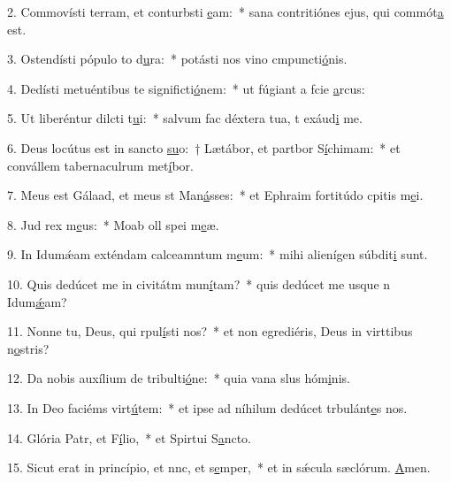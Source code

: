 2. Commovísti terram, et conturbsti \uline{e}am:~* sana contritiónes ejus, qui commót\uline{a} est.\par 
3. Ostendísti pópulo to d\uline{u}ra:~* potásti nos vino cmpuncti\uline{ó}nis.\par 
4. Dedísti metuéntibus te significti\uline{ó}nem:~* ut fúgiant a fcie \uline{a}rcus:\par 
5. Ut liberéntur dilcti t\uline{u}i:~* salvum fac déxtera tua, t exáud\uline{i} me.\par 
6. Deus locútus est in sancto \uline{su}o:~† Lætábor, et partbor S\uline{í}chimam:~* et convállem tabernaculrum met\uline{í}bor.\par 
7. Meus est Gálaad, et meus st Man\uline{á}sses:~* et Ephraim fortitúdo cpitis m\uline{e}i.\par 
8. Jud rex m\uline{e}us:~* Moab oll spei m\uline{e}æ.\par 
9. In Idumǽam exténdam calceamntum m\uline{e}um:~* mihi alienígen súbdit\uline{i} sunt.\par 
10. Quis dedúcet me in civitátm mun\uline{í}tam?~* quis dedúcet me usque n Idum\uline{ǽ}am?\par 
11. Nonne tu, Deus, qui rpul\uline{í}sti nos?~* et non egrediéris, Deus in virttibus n\uline{o}stris?\par 
12. Da nobis auxílium de tribulti\uline{ó}ne:~* quia vana slus hóm\uline{i}nis.\par 
13. In Deo faciéms virt\uline{ú}tem:~* et ipse ad níhilum dedúcet trbulánt\uline{e}s nos.\par 
14. Glória Patr, et F\uline{í}lio,~* et Spirtui S\uline{a}ncto.\par 
15. Sicut erat in princípio, et nnc, et s\uline{e}mper,~* et in sǽcula sæclórum. \uline{A}men.\par 
